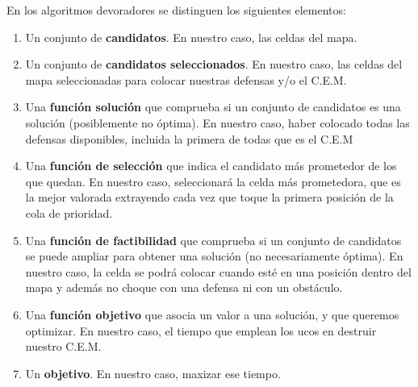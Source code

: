 En los algoritmos devoradores se distinguen los siguientes elementos:
\begin{enumerate}
    \item Un conjunto de \textbf{candidatos}. 
    En nuestro caso, las celdas del mapa.
    \item Un conjunto de \textbf{candidatos seleccionados}. 
    En nuestro caso, las celdas del mapa seleccionadas para colocar nuestras defensas y/o el C.E.M.
    \item Una \textbf{función solución} que comprueba si un conjunto de candidatos es una solución (posiblemente no óptima). 
    En nuestro caso, haber colocado todas las defensas disponibles, incluida la primera de todas que es el C.E.M
    \item Una \textbf{función de selección} que indica el candidato más prometedor de los que quedan. 
    En nuestro caso, seleccionará la celda más prometedora, que es la mejor valorada extrayendo cada vez que toque la primera posición de la cola de prioridad.
    \item Una \textbf{función de factibilidad} que comprueba si un conjunto de candidatos se puede ampliar para obtener una solución (no necesariamente óptima).
    En nuestro caso, la celda se podrá colocar cuando esté en una posición dentro del mapa y además no choque con una defensa ni con un obstáculo.
    \item Una \textbf{función objetivo} que asocia un valor a una solución, y que queremos optimizar. 
    En nuestro caso, el tiempo que emplean los ucos en destruir nuestro C.E.M.
    \item Un \textbf{objetivo}. En nuestro caso, maxizar ese tiempo.
\end{enumerate}